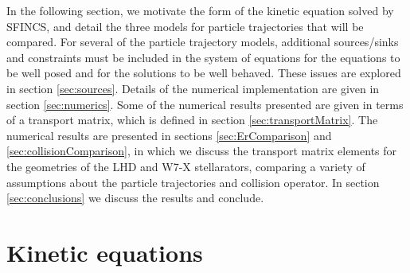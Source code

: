 \documentclass[12pt,superscriptaddress]{revtex4}
\begin{document}
In the following section, we motivate the form of the kinetic equation solved by SFINCS,
and detail the three models for particle trajectories that will be compared.
For several of the particle trajectory models,
additional sources/sinks and constraints must be included in the system of equations
for the equations to be well posed and for the solutions to be well behaved.
These issues are explored in section \ref{sec:sources}.
Details of the numerical implementation are given in section \ref{sec:numerics}.
Some of the numerical results presented are given in terms of a transport
matrix, which is defined in section \ref{sec:transportMatrix}.
The numerical results are presented in sections \ref{sec:ErComparison} and \ref{sec:collisionComparison},
in which we discuss the transport matrix elements for the geometries of the LHD and W7-X
stellarators, comparing a variety of assumptions about the particle trajectories and collision operator.
In section \ref{sec:conclusions} we discuss the results and conclude.

\section{Kinetic equations}
\label{sec:equations}
\end{document}
